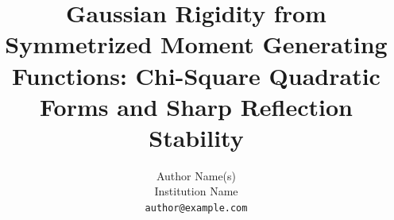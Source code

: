 \documentclass[11pt]{article}
\title{Gaussian Rigidity from Symmetrized Moment Generating Functions: Chi-Square Quadratic Forms and Sharp Reflection Stability}
\author{Author Name(s)\\[2pt]
  \small Institution Name\\[-1pt]
  \small \texttt{author@example.com}}
\date{}
\begin{document}
\maketitle
\begin{abstract}

\end{abstract}


\end{document}
